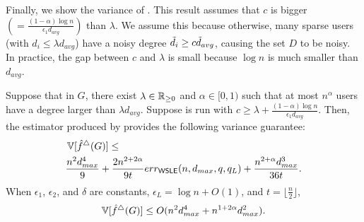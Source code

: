 Finally, we show the variance of \AlgWSTriVR{}. 
This result assumes that $c$ is bigger $(= \frac{(1-\alpha) \log n}{\epsilon_1 d_{avg}})$ than $\lambda$. 
We assume this 
because otherwise, many sparse users (with $d_i \leq \lambda d_{avg}$) have a noisy degree $\tilde{d}_i \geq c \tilde{d}_{avg}$, causing the set $D$ to
be noisy. In practice, the gap between $c$ and $\lambda$ is small because 
$\log n$ is much smaller than $d_{avg}$. 


\begin{theorem}
\label{chap3-thm:var_II_ast}
  Suppose that in $G$, there exist $\lambda \in \mathbb{R}_{\ge0}$ and $\alpha \in [0,1)$
  such that at most $n^\alpha$ users have a degree larger than
  $\lambda d_{avg}$. Suppose \AlgWSTriVR{} is
  run with $c \geq \lambda + \frac{(1-\alpha) \log n}{\epsilon_1 d_{avg}}$.
  Then, the estimator produced by
  \AlgWSTriVR{} provides the following variance guarantee:
\begin{align}
  &\operatorname{\mathbb{V}}[\hat{f}^\triangle(G)] \leq \nonumber\\
  &\frac{n^2 d_{max}^4}{9} + \frac{2n^{2+2\alpha}}{9t}err_{\textsf{WSLE}}(n,d_{max},q,q_L) + \frac{n^{2+\alpha}
  d_{max}^3 }{36t}.
  \label{chap3-eq:thm:l2_II_ast}
\end{align}
When $\epsilon_1$, $\epsilon_2$, and $\delta$ are constants,
$\epsilon_L = \log n + O(1)$, and $t = \lfloor\frac{n}{2}\rfloor$,
\begin{align}
  \operatorname{\mathbb{V}}[\hat{f}^\triangle(G)] \leq O(n^2 d_{max}^4 + n^{1+2\alpha} d_{max}^2).
  \label{chap3-eq:thm:l2_II_ast_simp}
\end{align}
\end{theorem}

